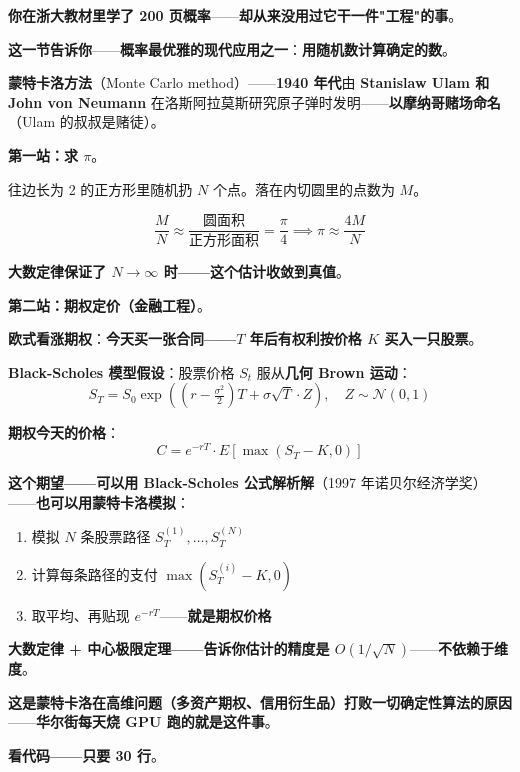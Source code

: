 \begin{tcolorbox}[ahabox={\Large Aha：蒙特卡洛求 $\pi$ 与期权定价}]
\textbf{你在浙大教材里学了 200 页概率}——\textbf{却从来没用过它干一件"工程"的事}。

\medskip

\textbf{这一节告诉你}——\textbf{概率最优雅的现代应用之一}：\textbf{用随机数计算确定的数}。

\textbf{蒙特卡洛方法}（Monte Carlo method）——\textbf{1940 年代}由 \textbf{Stanislaw Ulam 和 John von Neumann} 在洛斯阿拉莫斯研究原子弹时发明——\textbf{以摩纳哥赌场命名}（Ulam 的叔叔是赌徒）。

\medskip

\textbf{第一站：求 $\pi$}。

往边长为 2 的正方形里随机扔 $N$ 个点。落在内切圆里的点数为 $M$。

\[
\frac{M}{N} \approx \frac{\text{圆面积}}{\text{正方形面积}} = \frac{\pi}{4} \implies \pi \approx \frac{4M}{N}
\]

\textbf{大数定律保证了 $N \to \infty$ 时——这个估计收敛到真值}。

\medskip

\textbf{第二站：期权定价（金融工程）}。

\textbf{欧式看涨期权}：\textbf{今天买一张合同——$T$ 年后有权利按价格 $K$ 买入一只股票}。

\textbf{Black-Scholes 模型假设}：股票价格 $S_t$ 服从\textbf{几何 Brown 运动}：
\[
S_T = S_0 \exp\!\left((r - \tfrac{\sigma^2}{2})T + \sigma\sqrt{T} \cdot Z\right), \quad Z \sim \mathcal{N}(0,1)
\]

\textbf{期权今天的价格}：
\[
C = e^{-rT} \cdot E[\max(S_T - K, 0)]
\]

\textbf{这个期望——可以用 Black-Scholes 公式解析解}（1997 年诺贝尔经济学奖）——\textbf{也可以用蒙特卡洛模拟}：

\begin{enumerate}
\item 模拟 $N$ 条股票路径 $S_T^{(1)}, \dots, S_T^{(N)}$
\item 计算每条路径的支付 $\max(S_T^{(i)} - K, 0)$
\item 取平均、再贴现 $e^{-rT}$——\textbf{就是期权价格}
\end{enumerate}

\textbf{大数定律 + 中心极限定理——告诉你估计的精度是 $O(1/\sqrt{N})$}——\textbf{不依赖于维度}。

\textbf{这是蒙特卡洛在高维问题（多资产期权、信用衍生品）打败一切确定性算法的原因}——\textbf{华尔街每天烧 GPU 跑的就是这件事}。

\medskip

\textbf{看代码——只要 30 行}。
\end{tcolorbox}

